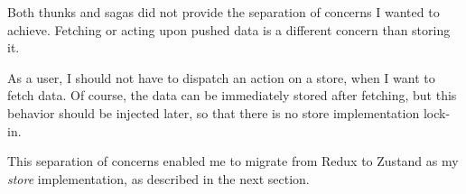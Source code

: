 Both thunks and sagas did not provide the separation of concerns I
wanted to achieve. Fetching or acting upon pushed data is a different
concern than storing it.

As a user, I should not have to dispatch an action on a store, when I
want to fetch data. Of course, the data can be immediately stored after
fetching, but this behavior should be injected later, so that there is
no store implementation lock-in.

This separation of concerns enabled me to migrate from Redux to Zustand
as my \emph{store} implementation, as described in the next section.
